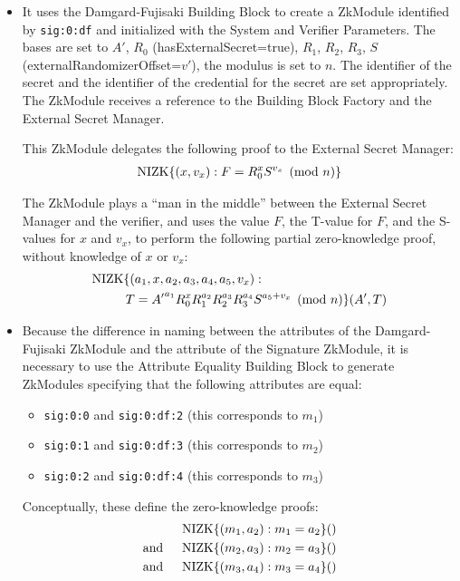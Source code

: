 \begin{itemize}
\begin{itemize}
\item It uses the Damgard-Fujisaki Building Block to create a ZkModule identified by \texttt{sig:0:df} and initialized
with the System and Verifier Parameters.
The bases are set to $A'$, $R_0$ (hasExternalSecret=true), $R_1$, $R_2$, $R_3$, $S$ (externalRandomizerOffset=$v'$), the modulus is set to $n$.
The identifier of the secret and the identifier of the credential for the
secret are set appropriately.
The ZkModule receives a reference to the Building Block Factory and the External Secret Manager.

This ZkModule delegates the following proof to the External Secret Manager:
\begin{align}
\operatorname{NIZK}\lbrace(x, v_x):
  F = R_0^x S^{v_x} \pmod{n}
\rbrace
\end{align}

The ZkModule plays a ``man in the middle'' between the External Secret Manager and the
verifier, and uses the value $F$, the T-value for $F$, and the S-values for $x$ and $v_x$,
to perform the following partial zero-knowledge proof, without knowledge of $x$ or $v_x$:
\begin{align}
\operatorname{NIZK}\lbrace(&a_1, x, a_2, a_3, a_4, a_5, v_x): \nonumber\\
T &= {A'}^{a_1}R_0^{x} R_1^{a_2}R_2^{a_3} R_3^{a_4} S^{a_5 + v_x} \pmod{n}
\rbrace(A', T)
\end{align}

\item Because the difference in naming between the attributes of the Damgard-Fujisaki ZkModule and the attribute
of the Signature ZkModule, it is necessary to use the Attribute Equality Building Block to generate
ZkModules specifying that the following attributes are equal:
  \begin{itemize}
  \item \texttt{sig:0:0} and \texttt{sig:0:df:2} (this corresponds to $m_1$)
  \item \texttt{sig:0:1} and \texttt{sig:0:df:3} (this corresponds to $m_2$)
  \item \texttt{sig:0:2} and \texttt{sig:0:df:4} (this corresponds to $m_3$)
  \end{itemize}
  Conceptually, these define the zero-knowledge proofs:
  \begin{align}
  \label{eq:ex:cl:last}
  &\operatorname{NIZK}\lbrace(m_1, a_2): m_1 = a_2\rbrace() \\
  \mbox{and }\quad&\operatorname{NIZK}\lbrace(m_2, a_3): m_2 = a_3\rbrace() \\
  \mbox{and }\quad&\operatorname{NIZK}\lbrace(m_3, a_4): m_3  = a_4\rbrace()
  \end{align}
\end{itemize}


\end{itemize}
